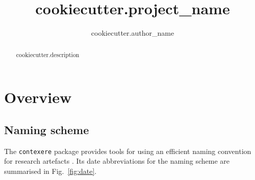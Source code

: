 \documentclass{report}
\begin{document}
\title{ {{ cookiecutter.project_name }} }
\author{ {{ cookiecutter.author_name }} }
\maketitle

\begin{abstract}
{{ cookiecutter.description }}
\end{abstract}


\tableofcontents

\chapter{Overview}
\section{Naming scheme}
The \texttt{contexere} package provides tools for using an efficient naming convention for research artefacts \cite{Contexere}. 
Its date abbreviations for the naming scheme are summarised in Fig.~\ref{fig:date}.
\end{document}
